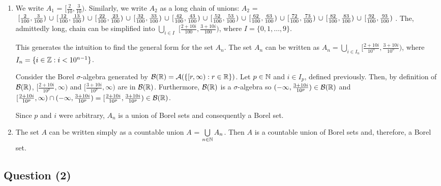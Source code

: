 \documentclass{article}
\begin{document}
\begin{flushleft}
    \begin{enumerate}[label=(\roman*)]
        \item We write $A_1$ = $[\frac{2}{10}, \frac{3}{10})$. Similarly, we write $A_2$ as a long chain of unions: $A_2$ = $\, [\frac{2}{100},\frac{3}{100}) \, \cup \, [\frac{12}{100},\frac{13}{100}) \, \cup \, [\frac{22}{100},\frac{23}{100}) \, \cup \, [\frac{32}{100},\frac{33}{100}) \, \cup \, [\frac{42}{100},\frac{43}{100}) \, \cup \, [\frac{52}{100},\frac{53}{100}) \, \cup \, [\frac{62}{100},\frac{63}{100}) \, \cup \, [\frac{72}{100},\frac{73}{100}) \, \cup \, [\frac{82}{100},\frac{83}{100}) \, \cup \, [\frac{92}{100},\frac{93}{100}) \,$. The, admittedly long, chain can be simplified into $\bigcup\limits_{i \in I}$ $[\frac{2 + 10i}{100}, \frac{3+10i}{100})$, where $I = \{0, 1, \dots ,9\}$.

        This generates the intuition to find the general form for the set $A_n$. The set $A_n$ can be written as $A_n = \bigcup\limits_{i \in I_n} [\frac{2 + 10i}{10^n}, \frac{3 + 10i}{10^n})$, where $I_n = \{i \in \mathbb{Z} : i < 10^{n-1}\}$.

        Consider the Borel $\sigma$-algebra generated by $\mathcal{B}(\mathbb{R}) = \mathcal{A}(\{[r, \infty) : r \in \mathbb{R}\})$. Let $p \in \mathbb{N}$ and $i \in I_p$, defined previously. Then, by definition of $\mathcal{B}(\mathbb{R})$, $[\frac{2+10i}{10^p}, \infty)$ and $[\frac{3+10i}{10^p}, \infty)$ are in $\mathcal{B}(\mathbb{R})$. Furthermore, $\mathcal{B}(\mathbb{R})$ is a $\sigma$-algebra so $(-\infty, \frac{3+10i}{10^p}) \in \mathcal{B}(\mathbb{R})$ and $[\frac{2+10i}{10^p}, \infty) \cap (-\infty, \frac{3+10i}{10^p}) = [\frac{2+10i}{10^p},\frac{3+10i}{10^p}) \in \mathcal{B}(\mathbb{R})$.

        Since $p$ and $i$ were arbitrary, $A_n$ is a union of Borel sets and consequently a Borel set. 
        \item The set $A$ can be written simply as a countable union $A$ = $\bigcup\limits_{n \in \mathbb{N}} A_n$. Then $A$ is a countable union of Borel sets and, therefore, a Borel set.
    \end{enumerate}
\end{flushleft}
\begin{center}
\section*{Question (2)}
\end{center}
\end{document}
